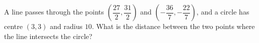 A line passes through the points $\left(\dfrac{27}{2},\dfrac{31}{2}\right)$ and $\left(-\dfrac{36}{7},-\dfrac{22}{7}\right)$, and a circle has centre $(3,3)$ and radius $10$. What is the distance between the two points where the line intersects the circle?
